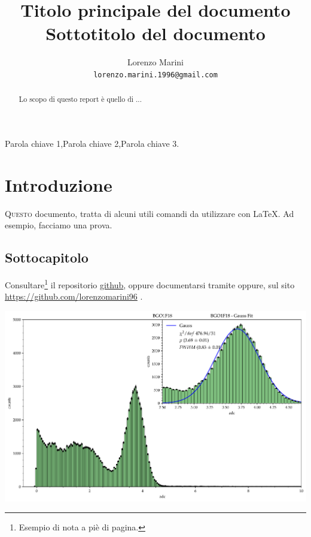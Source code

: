 \documentclass[preprint, twocolumn, 5p, lefttitle]{elsarticle} %
\title{\textbf{Titolo principale del documento \\ Sottotitolo del documento}}
\author{Lorenzo Marini \\ \texttt{lorenzo.marini.1996@gmail.com}}
\newenvironment{Figure}
  {\par\medskip\noindent\minipage{\linewidth}}
  {\endminipage\par\medskip}
\begin{document}
\let\WriteBookmarks\relax
\def\floatpagepagefraction{1}
\def\textpagefraction{.001}
\begin{frontmatter}
\begin{abstract}
Lo scopo di questo report è quello di ... 
\end{abstract}
\begin{keyword}
Parola chiave 1\sep Parola chiave 2\sep Parola chiave 3.
\end{keyword}
\end{frontmatter}
	\newpage
	\tableofcontents
	
\section{Introduzione}
\lettrine{Q}{uesto} documento, tratta di alcuni utili comandi da utilizzare con \LaTeX.
Ad esempio, facciamo una prova.
\subsection{Sottocapitolo}
\blindtext
\newline

Consultare\footnote{Esempio di nota a piè di pagina.} il repositorio \href{https://github.com/lorenzomarini96}{github}, oppure documentarsi tramite \cite{nome_da_citare} oppure, sul sito \url{https://github.com/lorenzomarini96} .
\newline

\begin{Figure}
	\centering
 	\includegraphics[width=\linewidth]{figure.pdf}
\end{Figure}
\end{document}

